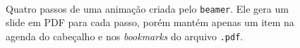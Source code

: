 \begin{figure}[hbt]
    \centering
\\

    \caption{Quatro passos de uma animação criada pelo \texttt{beamer}. Ele gera um slide em PDF para cada passo, porém mantém apenas um item na agenda do cabeçalho e nos \textit{bookmarks} do arquivo \texttt{.pdf}.}
    \label{fig:beamer}
\end{figure}


